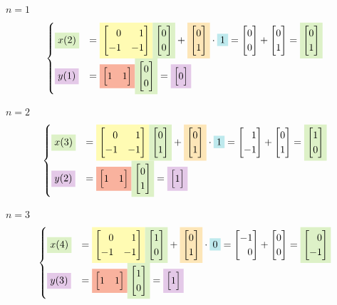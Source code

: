 \documentclass[12pt]{scrartcl}
\newcommand{\macierz}[1]{\begin{bmatrix}#1\end{bmatrix}}
\newcommand{\bgcolor}[2]{\colorbox{#1!30}{#2}}
\newcommand{\rownaniezmacierzax}[5]{
	\bgcolor{YellowGreen}{#1} &= \bgcolor{Yellow}{#2}\bgcolor{YellowGreen}{#3} + \bgcolor{Dandelion}{#4}\cdot\bgcolor{Turquoise}{#5}
}
\newcommand{\rownaniezmacierzaysimple}[3]{
	\bgcolor{Orchid}{#1} &= \bgcolor{Red}{#2}\bgcolor{YellowGreen}{#3}
}
\newcommand{\m}{\phantom{-}}
\begin{document}
$n=1$\\
$$
\begin{cases}
	\rownaniezmacierzax{$x(2)$}
	{$\vA$}							%
	{$\macierz{0 \\ 0}$}			%
	{$\macierz{0 \\ 1}$}			%
	{1}								%
	=\macierz{0 \\ 0} + \macierz{0 \\ 1}
	=\bgcolor{YellowGreen}{$\macierz{0 \\ 1}$}\\
	
	\rownaniezmacierzaysimple{$y(1)$}
	{$\macierz{1 & 1}$}				%
	{$\macierz{0 \\ 0}$}			%
	= \bgcolor{Orchid}{$\macierz{0}$}
\end{cases}
$$

$n=2$\\
$$
\begin{cases}
\rownaniezmacierzax{$x(3)$}
{$\vA$}							%
{$\macierz{0 \\ 1}$}			%
{$\macierz{0 \\ 1}$}			%
{1}								%
=\macierz{\m1 \\ -1} + \macierz{0 \\ 1}
=\bgcolor{YellowGreen}{$\macierz{1 \\ 0}$}\\

\rownaniezmacierzaysimple{$y(2)$}
{$\macierz{1 & 1}$}				%
{$\macierz{0 \\ 1}$}			%
= \bgcolor{Orchid}{$\macierz{1}$}
\end{cases}
$$

$n=3$\\
$$
\begin{cases}
\rownaniezmacierzax{$x(4)$}
{$\vA$}							%
{$\macierz{1 \\ 0}$}			%
{$\macierz{0 \\ 1}$}			%
{0}								%
=\macierz{-1 \\ \m0} + \macierz{0 \\ 0}
=\bgcolor{YellowGreen}{$\macierz{\m0 \\ -1}$}\\

\rownaniezmacierzaysimple{$y(3)$}
{$\macierz{1 & 1}$}				%
{$\macierz{1 \\ 0}$}			%
= \bgcolor{Orchid}{$\macierz{1}$}
\end{cases}
$$
\end{document}
